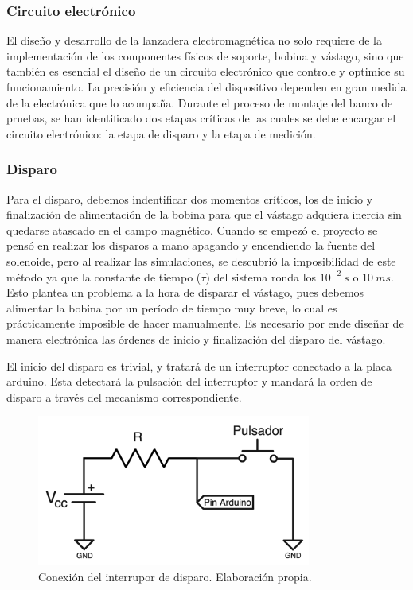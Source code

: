 \subsubsection{Circuito electrónico}
\label{subsub:circuito}
El diseño y desarrollo de la lanzadera electromagnética no solo requiere de la implementación de los componentes físicos de soporte, bobina y vástago, sino que también es esencial el diseño de un circuito electrónico que controle y optimice su funcionamiento. La precisión y eficiencia del dispositivo dependen en gran medida de la electrónica que lo acompaña. Durante el proceso de montaje del banco de pruebas, se han identificado dos etapas críticas de las cuales se debe encargar el circuito electrónico: la etapa de disparo y la etapa de medición.

\subsubsection*{Disparo}

Para el disparo, debemos indentificar dos momentos críticos, los de inicio y finalización de alimentación de la bobina para que el vástago adquiera inercia sin quedarse atascado en el campo magnético. Cuando se empezó el proyecto se pensó en realizar los disparos a mano apagando y encendiendo la fuente del solenoide, pero al realizar las simulaciones, se descubrió la imposibilidad de este método ya que la constante de tiempo (\(\tau\)) del sistema ronda los \(10^{-2}~s\) o \(10~ms\). Esto plantea un problema a la hora de disparar el vástago, pues debemos alimentar la bobina por un período de tiempo muy breve, lo cual es prácticamente imposible de hacer manualmente. Es necesario por ende diseñar de manera electrónica las órdenes de inicio y finalización del disparo del vástago.

El inicio del disparo es trivial, y tratará de un interruptor conectado a la placa arduino. Esta detectará la pulsación del interruptor y mandará la orden de disparo a través del mecanismo correspondiente.

\begin{figure}[H]
    \centering
    \includegraphics[width=9cm]{FigurasMemoria/conexionInterruptor.png}
    \caption{Conexión del interrupor de disparo. Elaboración propia.}
    \label{fig:conexionInterruptor} %
\end{figure}

